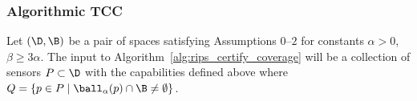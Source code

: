 \subsubsection{Algorithmic TCC}

%

Let $(\D,\B)$ be a pair of spaces satisfying Assumptions $0$--$2$ for constants $\alpha > 0$, $\beta\geq 3\alpha$.
The input to Algorithm~\ref{alg:rips_certify_coverage} will be a collection of sensors $P\subset\D$ with the capabilities defined above where $Q = \{ p\in P\mid \ball_\alpha(p)\cap \B\neq\emptyset \}$.


